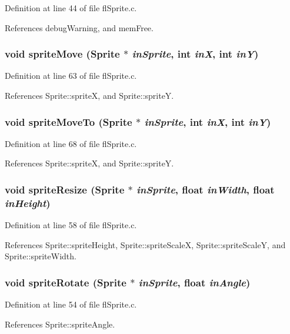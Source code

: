 Definition at line 44 of file fl\-Sprite.c.

References debug\-Warning, and mem\-Free.
\subsubsection{\setlength{\rightskip}{0pt plus 5cm}void sprite\-Move ({\bf Sprite} $\ast$ {\em in\-Sprite}, int {\em in\-X}, int {\em in\-Y})}\label{flSprite_8c_d56cc0d4d9b2984ee0a06f12c1da3263}




Definition at line 63 of file fl\-Sprite.c.

References Sprite::sprite\-X, and Sprite::sprite\-Y.
\subsubsection{\setlength{\rightskip}{0pt plus 5cm}void sprite\-Move\-To ({\bf Sprite} $\ast$ {\em in\-Sprite}, int {\em in\-X}, int {\em in\-Y})}\label{flSprite_8c_c8da86cb58ec719832b10d5185197901}




Definition at line 68 of file fl\-Sprite.c.

References Sprite::sprite\-X, and Sprite::sprite\-Y.
\subsubsection{\setlength{\rightskip}{0pt plus 5cm}void sprite\-Resize ({\bf Sprite} $\ast$ {\em in\-Sprite}, float {\em in\-Width}, float {\em in\-Height})}\label{flSprite_8c_e695b7e4c94be550370faae21d704f51}




Definition at line 58 of file fl\-Sprite.c.

References Sprite::sprite\-Height, Sprite::sprite\-Scale\-X, Sprite::sprite\-Scale\-Y, and Sprite::sprite\-Width.
\subsubsection{\setlength{\rightskip}{0pt plus 5cm}void sprite\-Rotate ({\bf Sprite} $\ast$ {\em in\-Sprite}, float {\em in\-Angle})}\label{flSprite_8c_a03f96fb85bdc642a43418313e9eb466}




Definition at line 54 of file fl\-Sprite.c.

References Sprite::sprite\-Angle.